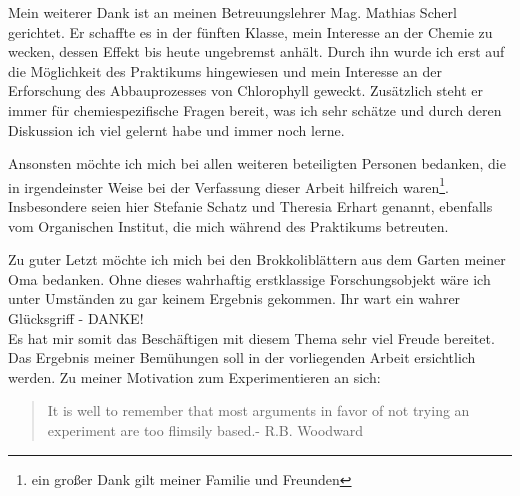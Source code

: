 Mein weiterer Dank ist an meinen Betreuungslehrer Mag. Mathias Scherl gerichtet. Er schaffte es in der fünften Klasse, mein Interesse an der Chemie zu wecken, dessen Effekt bis heute ungebremst anhält. Durch ihn wurde ich erst auf die Möglichkeit des Praktikums hingewiesen und mein Interesse an der Erforschung des Abbauprozesses von Chlorophyll geweckt. Zusätzlich steht er immer für chemiespezifische Fragen bereit, was ich sehr schätze und durch deren Diskussion ich viel gelernt habe und immer noch lerne. 

Ansonsten möchte ich mich bei allen weiteren beteiligten Personen bedanken, die in irgendeinster Weise bei der Verfassung dieser Arbeit hilfreich waren\footnote{ein großer Dank gilt meiner Familie und Freunden}. Insbesondere seien hier Stefanie Schatz und Theresia Erhart genannt, ebenfalls vom Organischen Institut, die mich während des Praktikums betreuten.  

Zu guter Letzt möchte ich mich bei den Brokkoliblättern aus dem Garten meiner Oma bedanken. Ohne dieses wahrhaftig erstklassige Forschungsobjekt wäre ich unter Umständen zu gar keinem Ergebnis gekommen. Ihr wart ein wahrer Glücksgriff - DANKE! \\

Es hat mir somit das Beschäftigen mit diesem Thema sehr viel Freude bereitet. Das Ergebnis meiner Bemühungen soll in der vorliegenden Arbeit ersichtlich werden. Zu meiner Motivation zum Experimentieren an sich: \\

\begin{quotation}
 \glqq It is well to remember that most arguments in favor of not trying an experiment are too flimsily based.\grqq - R.B. Woodward
 \end{quotation} 


